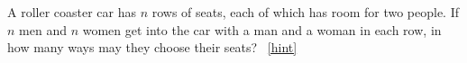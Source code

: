 \documentclass{book}
\begin{document}
\setcounter{project}{87}
\addtocounter{project}{-1}
\begin{activity}[]\label{activity-80}
\hypertarget{p-679}{}%
A roller coaster car has \(n\) rows of seats, each of which has room for two people. If \(n\) men and \(n\) women get into the car with a man and a woman in each row, in how many ways may they choose their seats?%
~\hfill{\tiny\hyperlink{a-87}{[hint]}\hypertarget{q-87}{}}\end{activity}
\end{document}
